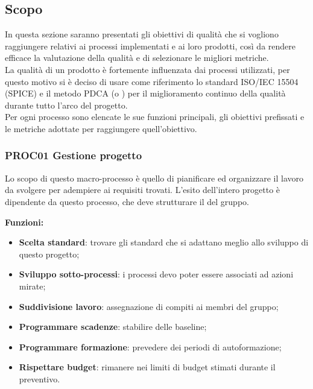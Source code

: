 \documentclass[../piano_di_qualifica.tex]{subfiles}
\begin{document}
\subsection{Scopo}
In questa sezione saranno presentati gli obiettivi di qualità che si vogliono raggiungere relativi ai processi implementati e ai loro prodotti, così da rendere efficace la valutazione della qualità e di selezionare le migliori metriche.\\
La qualità di un prodotto è fortemente influenzata dai processi utilizzati, per questo motivo si è deciso di usare come riferimento lo standard ISO/IEC 15504 (SPICE)  e il metodo PDCA (o ) per il miglioramento continuo della qualità durante tutto l'arco del progetto.\\
Per ogni processo sono elencate le sue funzioni principali, gli obiettivi prefissati e le metriche adottate per raggiungere quell’obiettivo.

\subsubsection{PROC01 Gestione progetto}
Lo scopo di questo macro-processo è quello di pianificare ed organizzare il lavoro da svolgere per adempiere ai requisiti trovati. L'esito dell'intero progetto è dipendente da questo processo, che deve strutturare il  del gruppo.

\setlength{\parindent}{0pt}\textbf{Funzioni:}
\smallbreak
\begin{itemize}
	\item \textbf{Scelta standard}: trovare gli standard che si adattano meglio allo sviluppo di questo progetto;
	\item \textbf{Sviluppo sotto-processi}: i processi devo poter essere associati ad azioni mirate;
	\item \textbf{Suddivisione lavoro}: assegnazione di compiti ai membri del gruppo;
	\item \textbf{Programmare scadenze}: stabilire delle baseline;
	\item \textbf{Programmare formazione}: prevedere dei periodi di autoformazione;
	\item \textbf{Rispettare budget}: rimanere nei limiti di budget stimati durante il preventivo.
\end{itemize}
\end{document}
